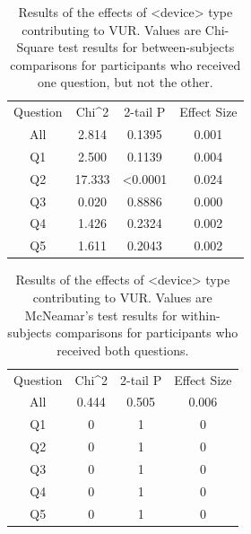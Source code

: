\documentclass{acm_proc_article-sp}
\begin{document}
\begin{table}%
\begin{center}
\begin{tabular}{| c | c | c | c |}
Question & Chi^2 &	2-tail P & Effect Size\\
All & 2.814 & 0.1395 & 0.001\\
Q1 & 2.500 & 0.1139 & 0.004\\
Q2 & 17.333 & <0.0001 & 0.024\\
Q3 & 0.020 & 0.8886 & 0.000\\
Q4 & 1.426 & 0.2324 & 0.002\\
Q5 & 1.611 & 0.2043 & 0.002\\
\end{tabular}
\caption{Results of the effects of <device> type contributing to VUR. Values are Chi-Square test results for between-subjects comparisons for participants who received one question, but not the other.}
\label{betweendevice}
\end{center}
\end{table}
						
\begin{table}%
\begin{center}
\begin{tabular}{| c | c | c | c |}
Question & Chi^2 &	2-tail P & Effect Size \\
All & 0.444  & 0.505 & 0.006\\
Q1 & 0 & 1 & 0 \\
Q2 & 0 & 1 & 0\\
Q3 & 0 & 1 & 0\\
Q4 & 0 & 1 & 0\\
Q5 & 0 & 1 & 0\\
\end{tabular}
\caption{Results of the effects of <device> type contributing to VUR. Values are McNeamar's test results for within-subjects comparisons for participants who received both questions.}
\label{withindevice}
\end{center}
\end{table}
\end{document}
